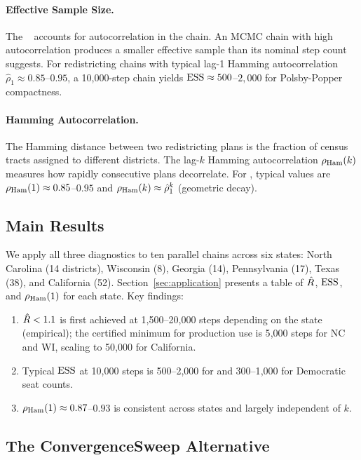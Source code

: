 \paragraph{Effective Sample Size.}
The \ess{}~\citep{geyer1992} accounts for autocorrelation in the chain.
An MCMC chain with high autocorrelation produces a smaller effective
sample than its nominal step count suggests.
For redistricting chains with typical lag-1 Hamming autocorrelation
$\hat{\rho}_1 \approx 0.85$--$0.95$, a 10{,}000-step chain yields
$\mathrm{ESS} \approx 500$--$2{,}000$ for Polsby-Popper compactness.

\paragraph{Hamming Autocorrelation.}
The Hamming distance between two redistricting plans is the fraction of
census tracts assigned to different districts.
The lag-$k$ Hamming autocorrelation $\rho_{\mathrm{Ham}}(k)$ measures how rapidly
consecutive plans decorrelate.
For \recom{}, typical values are $\rho_{\mathrm{Ham}}(1) \approx 0.85$--$0.95$ and
$\rho_{\mathrm{Ham}}(k) \approx \hat{\rho}_1^k$ (geometric decay).

\subsection{Main Results}

We apply all three diagnostics to ten parallel \recom{} chains across six
states: North Carolina (14 districts), Wisconsin (8), Georgia (14),
Pennsylvania (17), Texas (38), and California (52).
Section~\ref{sec:application} presents a table of $\hat{R}$, $\mathrm{ESS}$, and
$\rho_{\mathrm{Ham}}(1)$ for each state.
Key findings:

\begin{enumerate}
\item $\hat{R} < 1.1$ is first achieved at 1{,}500--20{,}000 steps depending
      on the state (empirical); the certified minimum for production use
      is 5{,}000 steps for NC and WI, scaling to 50{,}000 for California.
\item Typical $\mathrm{ESS}$ at 10{,}000 steps is 500--2{,}000 for \PP{} and
      300--1{,}000 for Democratic seat counts.
\item $\rho_{\mathrm{Ham}}(1) \approx 0.87$--$0.93$ is consistent across states and
      largely independent of $k$.
\end{enumerate}

\subsection{The ConvergenceSweep Alternative}

